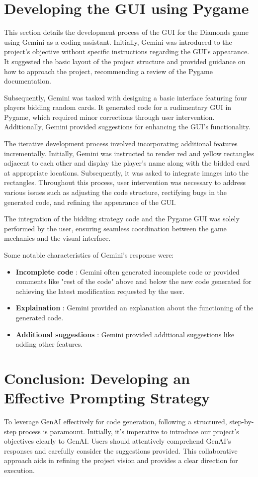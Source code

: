 \documentclass{article}
\begin{document}
\section{Developing the GUI using Pygame}
This section details the development process of the GUI for the Diamonds game using Gemini as a coding assistant. Initially, Gemini was introduced to the project's objective without specific instructions regarding the GUI's appearance. It suggested the basic layout of the project structure and provided guidance on how to approach the project, recommending a review of the Pygame documentation.

Subsequently, Gemini was tasked with designing a basic interface featuring four players bidding random cards. It generated code for a rudimentary GUI in Pygame, which required minor corrections through user intervention. Additionally, Gemini provided suggestions for enhancing the GUI's functionality.

The iterative development process involved incorporating additional features incrementally. Initially, Gemini was instructed to render red and yellow rectangles adjacent to each other and display the player's name along with the bidded card at appropriate locations. Subsequently, it was asked to integrate images into the rectangles. Throughout this process, user intervention was necessary to address various issues such as adjusting the code structure, rectifying bugs in the generated code, and refining the appearance of the GUI.

The integration of the bidding strategy code and the Pygame GUI was solely performed by the user, ensuring seamless coordination between the game mechanics and the visual interface.

Some notable characteristics of Gemini's response were: 
\begin{itemize}
	\item \textbf{Incomplete code} : Gemini often generated incomplete code or provided comments like "rest of the code" above and below the new code generated for achieving the latest modification requested by the user.
	\item \textbf{Explaination} : Gemini provided an explanation about the functioning of the generated code.
	\item \textbf{Additional suggestions} : Gemini provided additional suggestions like adding other features.
\end{itemize}

\section{Conclusion: Developing an Effective Prompting Strategy}
To leverage GenAI effectively for code generation, following a structured, step-by-step process is paramount. Initially, it's imperative to introduce our project's objectives clearly to GenAI. Users should attentively comprehend GenAI's responses and carefully consider the suggestions provided. This collaborative approach aids in refining the project vision and provides a clear direction for execution.
\end{document}
